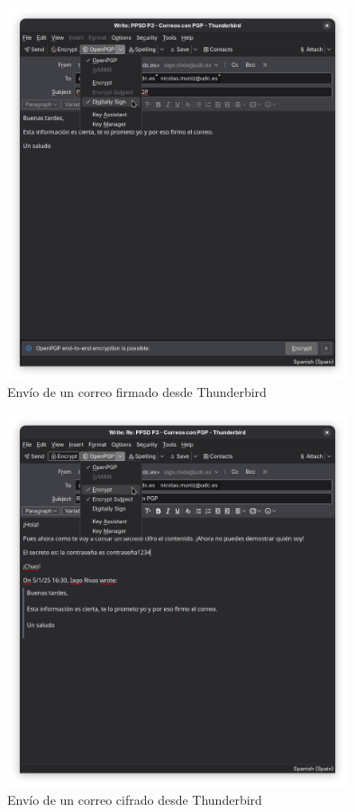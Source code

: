 \begin{figure}[H]
    \centering
    \includegraphics[width=10cm]{thunderbird-firmado.png}
    \caption{Envío de un correo firmado desde Thunderbird}
\end{figure}

\begin{figure}[H]
    \centering
    \includegraphics[width=10cm]{thunderbird-cifrado.png}
    \caption{Envío de un correo cifrado desde Thunderbird}
\end{figure}

